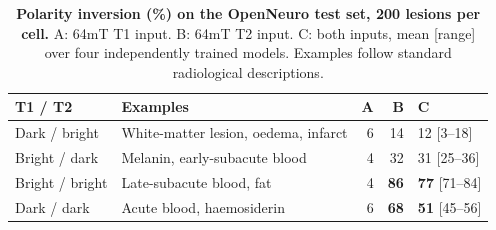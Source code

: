 \begin{table}[t]
{\caption{\textbf{Polarity inversion (\%) on the OpenNeuro test set, 200 lesions per cell.} A: 64mT T1 input. B: 64mT T2 input. C: both inputs, mean [range] over four independently trained models. Examples follow standard radiological descriptions.}}
{\small\setlength{\tabcolsep}{5pt}
\begin{tabular}{@{}llrrl@{}}
\toprule
\textbf{T1 / T2} & \textbf{Examples} & \textbf{A} & \textbf{B} & \textbf{C} \\
\midrule
Dark / bright & White-matter lesion, oedema, infarct & 6 & 14 & 12 [3--18] \\
Bright / dark & Melanin, early-subacute blood & 4 & 32 & 31 [25--36] \\
Bright / bright & Late-subacute blood, fat & 4 & \textbf{86} & \textbf{77} [71--84] \\
Dark / dark & Acute blood, haemosiderin & 6 & \textbf{68} & \textbf{51} [45--56] \\
\bottomrule
\end{tabular}}
\end{table}
